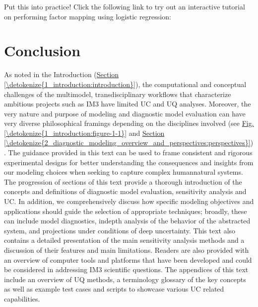 \documentclass[letterpaper,10pt,english]{sphinxmanual}
\begin{document}
\nopagebreak


\sphinxAtStartPar
Put this into practice! Click the following link to try out an interactive tutorial on performing factor mapping using logistic regression:

\sphinxAtStartPar
{}




\chapter{Conclusion}
\label{\detokenize{5_conclusion:conclusion}}\label{\detokenize{5_conclusion:id1}}\label{\detokenize{5_conclusion::doc}}
\sphinxAtStartPar
As noted in the Introduction (\hyperref[\detokenize{1_introduction:introduction}]{Section \ref{\detokenize{1_introduction:introduction}}}), the computational and conceptual challenges of the multi\sphinxhyphen{}model, transdisciplinary workflows that characterize ambitious projects such as IM3 have limited UC and UQ analyses. Moreover, the very nature and purpose of modeling and diagnostic model evaluation can have very diverse philosophical framings depending on the disciplines involved (see \hyperref[\detokenize{1_introduction:figure-1-1}]{Fig.\@ \ref{\detokenize{1_introduction:figure-1-1}}} and \hyperref[\detokenize{2_diagnostic_modeling_overview_and_perspectives:perspectives}]{Section \ref{\detokenize{2_diagnostic_modeling_overview_and_perspectives:perspectives}}}). The guidance provided in this text can be used to frame consistent and rigorous experimental designs for better understanding the consequences and insights from our modeling choices when seeking to capture complex human\sphinxhyphen{}natural systems. The progression of sections of this text provide a thorough introduction of the concepts and definitions of diagnostic model evaluation, sensitivity analysis and UC. In addition, we comprehensively discuss how specific modeling objectives and applications should guide the selection of appropriate techniques; broadly, these can include model diagnostics, in\sphinxhyphen{}depth analysis of the behavior of the abstracted system, and projections under conditions of deep uncertainty. This text also contains a detailed presentation of the main sensitivity analysis methods and a discussion of their features and main limitations. Readers are also provided with an overview of computer tools and platforms that have been developed and could be considered in addressing IM3 scientific questions. The appendices of this text include an overview of UQ methods, a terminology glossary of the key concepts as well as example test cases and scripts to showcase various UC related capabilities.
\end{document}
